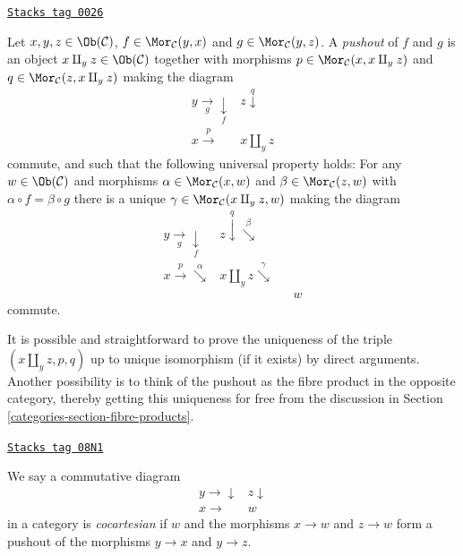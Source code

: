 \begin{definition}[Pushouts]
\label{categories-definition-pushouts}
\href{https://stacks.math.columbia.edu/tag/0026}{\texttt{Stacks tag 0026}}

Let $x, y, z\in \Ob(\mathcal{C})$,
$f\in \Mor_\mathcal{C}(y, x)$
and $g\in \Mor_{\mathcal C}(y, z)$.
A {\it pushout} of $f$ and $g$ is
an object $x\amalg_y z\in \Ob(\mathcal{C})$
together with morphisms
$p\in \Mor_{\mathcal C}(x, x\amalg_y z)$ and
$q\in\Mor_{\mathcal C}(z, x\amalg_y z)$ making the diagram
$$
\begin{array}{cc}y \underset{g}{\longrightarrow}\underset{f}{\downarrow} & z \overset{q}{\downarrow} \\ x \overset{p}{\longrightarrow} & x\amalg_y z\end{array}
$$
commute, and such that the following universal property holds:
For any $w\in \Ob(\mathcal{C})$ and morphisms
$\alpha \in \Mor_{\mathcal C}(x, w)$ and
$\beta \in \Mor_\mathcal{C}(z, w)$ with
$\alpha \circ f = \beta \circ g$ there is a unique
$\gamma\in \Mor_{\mathcal C}(x\amalg_y z, w)$ making
the diagram
$$
\begin{array}{cccc}y \underset{g}{\longrightarrow}\underset{f}{\downarrow} & z \overset{q}{\downarrow}\overset{\beta}{\searrow} &  &  \\ x \overset{p}{\longrightarrow}\overset{\alpha}{\searrow} & x \amalg_y z \overset{\gamma}{\searrow} &  &  \\  &  &  & w\end{array}
$$
commute.
\end{definition}

It is possible and straightforward to prove the uniqueness of the triple
$(x\amalg_y z, p, q)$ up to unique isomorphism (if it exists) by direct
arguments. Another possibility is to think of the pushout as the
fibre product in the opposite category, thereby getting this uniqueness for
free from the discussion in Section \ref{categories-section-fibre-products}.

\begin{definition}[Cocartesian]
\label{categories-definition-cocartesian}
\href{https://stacks.math.columbia.edu/tag/08N1}{\texttt{Stacks tag 08N1}}

We say a commutative diagram
$$
\begin{array}{cc}y \longrightarrow\downarrow & z \downarrow \\ x \longrightarrow & w\end{array}
$$
in a category is {\it cocartesian} if $w$ and the morphisms $x \to w$ and
$z \to w$ form a pushout of the morphisms $y \to x$ and $y \to z$.
\end{definition}


